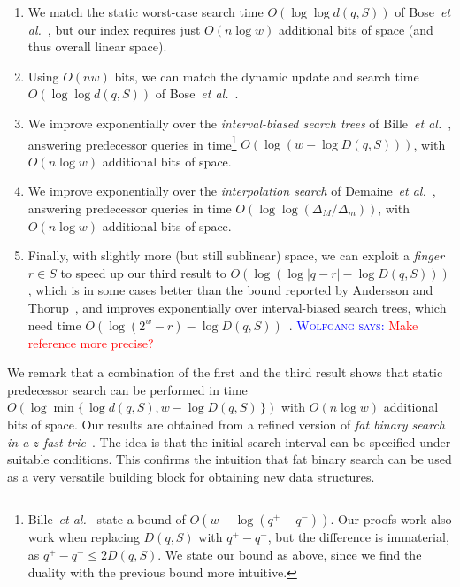 \documentclass[a4paper,11pt]{article}
\newcommand{\etal}{\emph{et al.}\xspace}
\newcommand{\?}{\mskip1.5mu}
\newcommand{\aremark}[3]{\textcolor{blue}{\textsc{#1 #2:}}
  \textcolor{red}{\textsf{#3}}}
\newcommand{\wolfgang}[2][says]{\aremark{Wolfgang}{#1}{#2}}
\begin{document}
\begin{enumerate}
  \item We match the static worst-case search time 
  $O(\log\log d(q, S))$
  of Bose~\etal~\cite{BoseDoDuHoMo13}, but our index requires 
  just $O(n\log w)$ additional bits of space (and thus overall 
  linear space).
  \item Using $O(nw)$ bits, we can match the dynamic
  update and search time $O(\log\log d(q, S))$
  of Bose~\etal~\cite{BoseDoDuHoMo13}.
  \item 
  We improve exponentially over the \emph{interval-biased search
  trees} of Bille~\etal~\cite{BilleLaRaSaSaWe15}, answering 
  predecessor queries in time\footnote{Bille~\etal~\cite{BilleLaRaSaSaWe15} 
  state a bound of $O(w - \log(q^+ - q^-))$. Our 
  proofs work also work when replacing $D(q, S)$ with $q^+ - q^-$, but 
  the difference is immaterial, as $q^+ - q^-\leq 2D(q, S)$. We state
  our bound as above, since
  we find the duality with the previous bound more intuitive.} 
  $O(\log(w - \log D(q, S)))$, with 
  $O(n\log w)$ additional bits of space.
  \item We improve exponentially over the \emph{interpolation
  search} of Demaine~\etal~\cite{DemaineJoPa04}, answering
  predecessor queries in time 
  $O(\log\log(\Delta_M / \Delta_m))$, with
  $O(n\log w)$ additional bits of space.
  \item Finally, with slightly more (but still sublinear) space,
  we can exploit a \emph{finger} $r \in S$ to speed up our third 
  result to $O\left(\log(\log|q - r| - \log D(q, S))\right)$, which is in
  some cases better than the bound reported
  by Andersson and Thorup~\cite{AnderssonTh07}, and improves 
  exponentially over interval-biased search trees, which need 
  time  
  $O\left(\log(2^w - r) - \log D(q, S)\right)$~\cite{BilleLaRaSaSaWe15}.
  \wolfgang{Make reference more precise?}
\end{enumerate}
We remark that a combination of the first
and the third result shows that static predecessor 
search can be performed in time  
$O(\log \min \{\,\log d(q, S),w-\log D(q, S)\,\})$ 
with $O(n \log w)$ additional bits of space. 
Our 
results are obtained from a refined version of
\emph{fat binary search in a $z$-fast trie}~\cite{BelazzouguiBoPaVi09}.
The idea is that
the initial search interval can be specified under 
suitable conditions. This confirms the intuition that fat
binary search can be used as a very versatile building block 
for obtaining new data structures.
\end{document}
